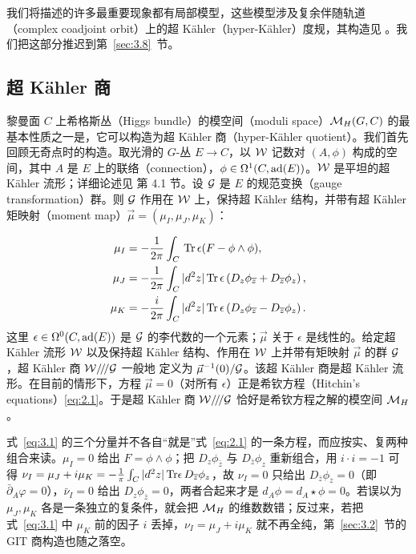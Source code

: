 我们将描述的许多最重要现象都有局部模型，这些模型涉及复余伴随轨道（complex coadjoint orbit）上的超 Kähler（hyper-Kähler）度规，其构造见 \cite{ref34,ref35,ref36,ref37}。我们把这部分推迟到第~\ref{sec:3.8}~节。



\subsection{超 Kähler 商}
\label{sec:3.1}

黎曼面 $C$ 上希格斯丛（Higgs bundle）的模空间（moduli space）${{\mathcal{M}}_H}(G,C)$ 的最基本性质之一是，它可以构造为超 Kähler 商（hyper-Kähler quotient）\cite{ref21}。我们首先回顾无奇点时的构造。取光滑的 $G$-丛 $E\to C$，以 $\mathcal{W}$ 记数对 $(A,\phi)$ 构成的空间，其中 $A$ 是 $E$ 上的联络（connection），$\phi\in
\Omega^1(C,{\rm ad}(E))$。$\mathcal{W}$ 是平坦的超 Kähler 流形；详细论述见 \cite{ref8} 第 4.1 节。设 $\mathcal{G}$ 是 $E$ 的规范变换（gauge transformation）群。则 $\mathcal{G}$ 作用在 $\mathcal{W}$ 上，保持超 Kähler 结构，并带有超 Kähler 矩映射（moment map）$\vec\mu=(\mu_I,\mu_J,\mu_K)$：

\setcounter{equation}{0}
\begin{equation}\label{eq:3.1}
  \begin{aligned}\mu_I & =-{1\over
2\pi}\int_C\,{\rm Tr}\,\epsilon(F-\phi\wedge \phi),\\ \mu_J &
=-{1\over 2\pi}\int_C|d^2z|\,{\rm Tr}\,\epsilon\left(D_z\phi_{\overline
z}+D_{\overline z}\phi_z\right), \\ \mu_K& = -{i\over
2\pi}\int_C|d^2z|\,{\rm Tr}\,\epsilon\left(D_z\phi_{\overline z}-D_{\overline
z}\phi_z\right).\end{aligned}
\end{equation}
这里 $\epsilon\in \Omega^0(C,{\rm ad}(E))$
是 $\mathcal{G}$ 的李代数的一个元素；$\vec\mu$ 关于 $\epsilon$ 是线性的。给定超 Kähler 流形 $\mathcal{W}$ 以及保持超 Kähler 结构、作用在 $\mathcal{W}$ 上并带有矩映射 $\vec\mu$ 的群
$\mathcal{G}$，超 Kähler 商
$\mathcal{W}/\negthinspace/\negthinspace/\mathcal{G}$ 一般地 \cite{ref49} 定义为 $\vec\mu^{-1}(0)/\mathcal{G}$。该超 Kähler 商是超 Kähler 流形。在目前的情形下，方程
$\vec\mu=0$（对所有 $\epsilon$）正是希钦方程（Hitchin's equations）\eqref{eq:2.1}。于是超 Kähler 商 $\mathcal{W}/\negthinspace/\negthinspace/\mathcal{G}$ 恰好是希钦方程之解的模空间 ${{\mathcal{M}}_H}$。

\begin{yizhu}[含糊点拨]
式~\eqref{eq:3.1} 的三个分量并不各自“就是”式~\eqref{eq:2.1} 的一条方程，而应按实、复两种组合来读。$\mu_I=0$ 给出 $F=\phi\wedge\phi$；把 $D_z\phi_{\bar z}$ 与 $D_{\bar z}\phi_z$ 重新组合，用 $i\cdot i=-1$ 可得 $\nu_I=\mu_J+i\mu_K=-{1\over\pi}\int_C|d^2z|\,{\rm Tr}\epsilon\,D_{\overline z}\phi_z$，故 $\nu_I=0$ 只给出 $D_{\bar z}\phi_z=0$（即 $\bar\partial_A\varphi=0$），$\bar\nu_I=0$ 给出 $D_z\phi_{\bar z}=0$，两者合起来才是 $d_A\phi=d_A\star\phi=0$。若误以为 $\mu_J,\mu_K$ 各是一条独立的复条件，就会把 ${{\mathcal{M}}_H}$ 的维数数错；反过来，若把式~\eqref{eq:3.1} 中 $\mu_K$ 前的因子 $i$ 丢掉，$\nu_I=\mu_J+i\mu_K$ 就不再全纯，第~\ref{sec:3.2}~节的 GIT 商构造也随之落空。
\end{yizhu}

